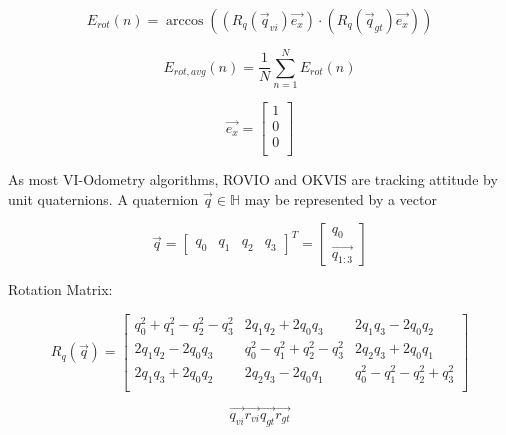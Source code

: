 \begin{equation}
       E_{rot} \left( n \right) = \arccos \left(\left( R_q\left(\vec{q}_{vi}\right) \vec{e_{x}} \right) \cdot \left( R_q\left(\vec{q}_{gt}\right) \vec{e_{x}} \right)\right)
\end{equation}

\begin{equation}
       E_{rot, avg} \left( n \right) = \frac{1}{N} \sum_{n=1}^N E_{rot} \left( n \right)
\end{equation}

\begin{equation}
       \vec{e_{x}} = \left[ \begin{array}{c}
	1 \\
	0 \\
	0 \\ \end{array} \right]
\end{equation}

As most VI-Odometry algorithms, ROVIO and OKVIS are tracking attitude by unit quaternions. A quaternion $ \vec{q} \in \mathbb{H} $ may be represented by a vector

\begin{equation}
       \vec{q} = \left[ \begin{array}{cccc} q_0 & q_1 & q_2 & q_3 \end{array} \right]^T 
		   = \left[ \begin{array}{c} q_0 \\ \vec{q_{1 : 3}} \end{array} \right]
\end{equation}

Rotation Matrix:

\begin{equation}
       R_q \left( \vec{q}\right) = \left[ \begin{array}{ccc}
		q_0^2+q_1^2-q_2^2-q_3^2 	& 2 q_1 q_2+2 q_0 q_3			& 2 q_1 q_3-2 q_0 q_2 \\
		2 q_1 q_2-2 q_0 q_3		& q_0^2-q_1^2+q_2^2-q_3^2 	& 2 q_2 q_3+2 q_0 q_1 \\
		2 q_1 q_3+2 q_0 q_2		& 2 q_2 q_3-2 q_0 q_1			& q_0^2-q_1^2-q_2^2+q_3^2 \\
		\end{array} \right]
\end{equation}

\begin{equation}
       \vec{q_{vi}} \vec{r_{vi}} \vec{q_{gt}} \vec{r_{gt}}
\end{equation}







